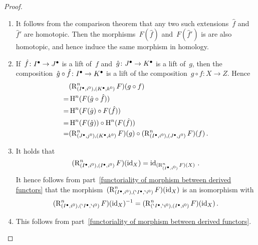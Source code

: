 \begin{proof}
  \leavevmode
  \begin{enumerate}
    \item
      It follows from the comparison theorem that any two such extensions~$\hat{f}$ and~$\hat{f}'$ are homotopic.
      Then the morphisms~$F(\hat{f})$ and~$F(\hat{f}')$ is are also homotopic, and hence induce the same morphism in homology.
    \item
      If~$\hat{f} \colon I^\bullet \to J^\bullet$ is a lift of~$f$ and~$\hat{g} \colon J^\bullet \to K^\bullet$ is a lift of~$g$, then the composition~$\hat{g} \circ \hat{f} \colon I^\bullet \to K^\bullet$ is a lift of the composition~$g \circ f \colon X \to Z$.
      Hence
      \begin{align*}
         &{}  (\operatorname{R}^n_{(I^\bullet,i^0), (K^\bullet,k^0)} F)(g \circ f)  \\
        =&{}  \operatorname{H}^n( F(\hat{g} \circ \hat{f}) ) \\
        =&{}  \operatorname{H}^n( F(\hat{g}) \circ F(\hat{f}) )  \\
        =&{}  \operatorname{H}^n( F(\hat{g}) ) \circ \operatorname{H}^n( F(\hat{f}) ) \\
        =&{}  (\operatorname{R}^n_{(J^\bullet,j^0), (K^\bullet,k^0)} F)(g)
              \circ
              (\operatorname{R}^n_{(I^\bullet,i^0), (J^\bullet,j^0)} F)(f)  \,.
      \end{align*}
    \item
      It holds that
      \[
        (\operatorname{R}^n_{(I^\bullet,i^0), (I^\bullet, i^0)} F)(\operatorname{id}_X) 
        =
        \operatorname{id}_{(\operatorname{R}^n_{(I^\bullet,i^0)} F)(X)} \,.
      \]
      It hence follows from part~\ref*{functoriality of morphism between derived functors} that the morphism~$(\operatorname{R}^n_{(I^\bullet,i^0), ({}^{\backprime}I^\bullet, {}^{\backprime} i^0)} F)(\operatorname{id}_X)$ is an isomorphism with
      \[
          (\operatorname{R}^n_{(I^\bullet,i^0), ({}^{\backprime}I^\bullet, {}^{\backprime} i^0)} F)(\operatorname{id}_X)^{-1}
        = (\operatorname{R}^n_{({}^{\backprime}I^\bullet, {}^{\backprime} i^0), (I^\bullet,i^0)} F)(\operatorname{id}_X) \,.
      \]
    \item
      This follows from part~\ref*{functoriality of morphism between derived functors}.
    \qedhere
  \end{enumerate}
\end{proof}


